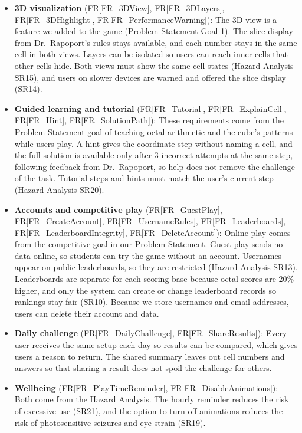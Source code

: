 \documentclass[12pt]{article}
\newcommand{\rref}[1]{FR\ref{#1}}
\begin{document}
\begin{itemize}
\item \textbf{3D visualization} (\rref{FR_3DView}, \rref{FR_3DLayers}, \rref{FR_3DHighlight}, \rref{FR_PerformanceWarning}): \newline
The 3D view is a feature we added to the game (Problem Statement Goal 1). The slice display from Dr.\ Rapoport's rules stays available, and each number stays in the same cell in both views. Layers can be isolated so users can reach inner cells that other cells hide. Both views must show the same cell states (Hazard Analysis SR15), and users on slower devices are warned and offered the slice display (SR14).

\item \textbf{Guided learning and tutorial} (\rref{FR_Tutorial}, \rref{FR_ExplainCell}, \rref{FR_Hint}, \rref{FR_SolutionPath}): \newline
These requirements come from the Problem Statement goal of teaching octal arithmetic and the cube's patterns while users play. A hint gives the coordinate step without naming a cell, and the full solution is available only after 3 incorrect attempts at the same step, following feedback from Dr.\ Rapoport, so help does not remove the challenge of the task. Tutorial steps and hints must match the user's current step (Hazard Analysis SR20).

\item \textbf{Accounts and competitive play} (\rref{FR_GuestPlay}, \rref{FR_CreateAccount}, \rref{FR_UsernameRules}, \rref{FR_Leaderboards}, \rref{FR_LeaderboardIntegrity}, \rref{FR_DeleteAccount}): \newline
Online play comes from the competitive goal in our Problem Statement. Guest play sends no data online, so students can try the game without an account. Usernames appear on public leaderboards, so they are restricted (Hazard Analysis SR13). Leaderboards are separate for each scoring base because octal scores are 20\% higher, and only the system can create or change leaderboard records so rankings stay fair (SR10). Because we store usernames and email addresses, users can delete their account and data.

\item \textbf{Daily challenge} (\rref{FR_DailyChallenge}, \rref{FR_ShareResults}): \newline
Every user receives the same setup each day so results can be compared, which gives users a reason to return. The shared summary leaves out cell numbers and answers so that sharing a result does not spoil the challenge for others.

\item \textbf{Wellbeing} (\rref{FR_PlayTimeReminder}, \rref{FR_DisableAnimations}): \newline
Both come from the Hazard Analysis. The hourly reminder reduces the risk of excessive use (SR21), and the option to turn off animations reduces the risk of photosensitive seizures and eye strain (SR19).
\end{itemize}
\end{document}
